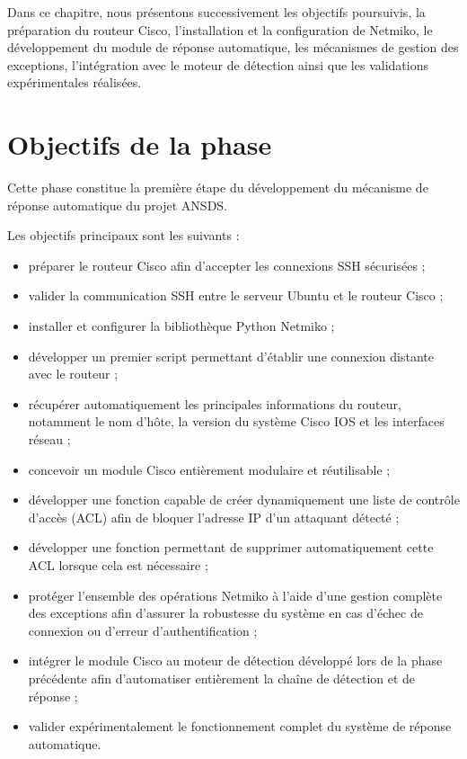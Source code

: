 Dans ce chapitre, nous présentons successivement les objectifs poursuivis, la préparation du routeur Cisco, l'installation et la configuration de Netmiko, le développement du module de réponse automatique, les mécanismes de gestion des exceptions, l'intégration avec le moteur de détection ainsi que les validations expérimentales réalisées.

\section{Objectifs de la phase}

Cette phase constitue la première étape du développement du mécanisme de réponse
automatique du projet ANSDS.

Les objectifs principaux sont les suivants :

\begin{itemize}

\item préparer le routeur Cisco afin d'accepter les connexions SSH sécurisées ;

\item valider la communication SSH entre le serveur Ubuntu et le routeur Cisco ;

\item installer et configurer la bibliothèque Python Netmiko ;

\item développer un premier script permettant d'établir une connexion distante avec le routeur ;

\item récupérer automatiquement les principales informations du routeur, notamment le nom d'hôte, la version du système Cisco IOS et les interfaces réseau ;

\item concevoir un module Cisco entièrement modulaire et réutilisable ;

\item développer une fonction capable de créer dynamiquement une liste de contrôle d'accès (ACL) afin de bloquer l'adresse IP d'un attaquant détecté ;

\item développer une fonction permettant de supprimer automatiquement cette ACL lorsque cela est nécessaire ;

\item protéger l'ensemble des opérations Netmiko à l'aide d'une gestion complète des exceptions afin d'assurer la robustesse du système en cas d'échec de connexion ou d'erreur d'authentification ;

\item intégrer le module Cisco au moteur de détection développé lors de la phase précédente afin d'automatiser entièrement la chaîne de détection et de réponse ;

\item valider expérimentalement le fonctionnement complet du système de réponse automatique.

\end{itemize}

